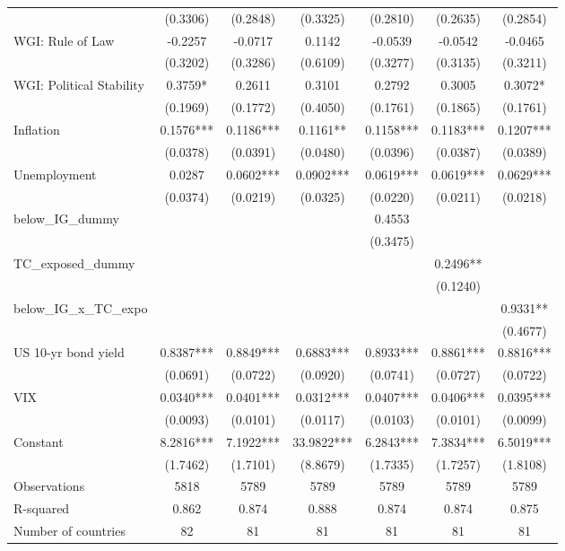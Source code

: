 \documentclass[10pt]{article}
\begin{document}
\begin{table}[h!]
\begin{threeparttable}
\begin{tabular}{lcccccc}
     & (0.3306) & (0.2848) & (0.3325) & (0.2810) & (0.2635) & (0.2854) \\[2pt]
    WGI: Rule of Law & -0.2257 & -0.0717 & 0.1142 & -0.0539 & -0.0542 & -0.0465 \\
     & (0.3202) & (0.3286) & (0.6109) & (0.3277) & (0.3135) & (0.3211) \\[2pt]
    WGI: Political Stability & 0.3759* & 0.2611 & 0.3101 & 0.2792 & 0.3005 & 0.3072* \\
     & (0.1969) & (0.1772) & (0.4050) & (0.1761) & (0.1865) & (0.1761) \\[2pt]
    Inflation & 0.1576*** & 0.1186*** & 0.1161** & 0.1158*** & 0.1183*** & 0.1207*** \\
     & (0.0378) & (0.0391) & (0.0480) & (0.0396) & (0.0387) & (0.0389) \\[2pt]
    Unemployment & 0.0287 & 0.0602*** & 0.0902*** & 0.0619*** & 0.0619*** & 0.0629*** \\
     & (0.0374) & (0.0219) & (0.0325) & (0.0220) & (0.0211) & (0.0218) \\[2pt]
    below\_IG\_dummy &  &  &  & 0.4553 &  &  \\
     &  &  &  & (0.3475) &  &  \\[2pt]
    TC\_exposed\_dummy &  &  &  &  & 0.2496** &  \\
     &  &  &  &  & (0.1240) &  \\[2pt]
    below\_IG\_x\_TC\_expo &  &  &  &  &  & 0.9331** \\
     &  &  &  &  &  & (0.4677) \\[2pt]
    \midrule
    US 10-yr bond yield & 0.8387*** & 0.8849*** & 0.6883*** & 0.8933*** & 0.8861*** & 0.8816*** \\
     & (0.0691) & (0.0722) & (0.0920) & (0.0741) & (0.0727) & (0.0722) \\[2pt]
    VIX & 0.0340*** & 0.0401*** & 0.0312*** & 0.0407*** & 0.0406*** & 0.0395*** \\
     & (0.0093) & (0.0101) & (0.0117) & (0.0103) & (0.0101) & (0.0099) \\[2pt]
    \midrule
    Constant & 8.2816*** & 7.1922*** & 33.9822*** & 6.2843*** & 7.3834*** & 6.5019*** \\
     & (1.7462) & (1.7101) & (8.8679) & (1.7335) & (1.7257) & (1.8108) \\[2pt]
    Observations & 5818 & 5789 & 5789 & 5789 & 5789 & 5789 \\
    R-squared & 0.862 & 0.874 & 0.888 & 0.874 & 0.874 & 0.875 \\
    Number of countries & 82 & 81 & 81 & 81 & 81 & 81 \\

\end{tabular}
\end{threeparttable}
\end{table}
\end{document}
